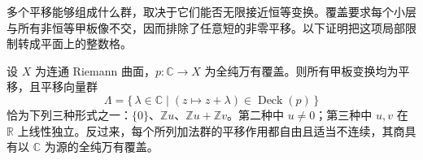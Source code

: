 \ProseParagraphBreak
多个平移能够组成什么群，取决于它们能否无限接近恒等变换。覆盖要求每个小层与所有非恒等甲板像不交，因而排除了任意短的非零平移。以下证明把这项局部限制转成平面上的整数格。

\begin{proposition}[平面的离散平移群]\label{b3:prop:12-translation-lattice}
设 \(X\) 为连通 Riemann 曲面，\(p:\mathbb C\to X\) 为全纯万有覆盖。则所有甲板变换均为平移，且平移向量群
\[
 \Lambda=\{\,\lambda\in\mathbb C\mid
              (z\mapsto z+\lambda)\in\operatorname{Deck}(p)\,\}
\]
恰为下列三种形式之一：\(\{0\}\)、\(\mathbb Zu\)、\(\mathbb Zu+\mathbb Zv\)。第二种中 \(u\ne0\)；第三种中 \(u,v\) 在 \(\mathbb R\) 上线性独立。反过来，每个所列加法群的平移作用都自由且适当不连续，其商具有以 \(\mathbb C\) 为源的全纯万有覆盖。
\end{proposition}
